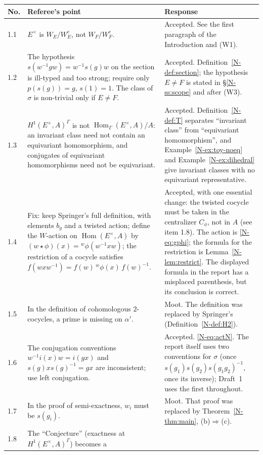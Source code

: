 \documentclass[12pt,letterpaper]{article}
\newcommand{\act}[2]{{}^{#1}\!#2}
\DeclareMathOperator{\Hom}{Hom}
\begin{document}
\begin{longtable}{@{}p{}p{}p{}@{}}
\toprule
No. & Referee's point & Response \\
\midrule
\endhead
1.1 & $E^\times$ is $W_E/W_E^c$, not $W_F/W_F^c$. & Accepted. See the
first paragraph of the Introduction and (W1). \\
1.2 & The hypothesis $s(w^{-1}gw)=w^{-1}s(g)w$ on the section is
ill-typed and too strong; require only $p(s(g))=g$, $s(1)=1$. The class of
$\sigma$ is non-trivial only if $E\neq F$. & Accepted.
Definition~\ref{N-def:section}; the hypothesis $E\neq F$ is stated in
\S\ref{N-ss:scope} and after (W3). \\
1.3 & $H^1(E^\times,A)^\Gamma$ is not
$\Hom_\Gamma(E^\times,A)/A$: an invariant class need not contain an
equivariant homomorphism, and conjugates of equivariant homomorphisms need
not be equivariant. & Accepted. Definition~\ref{N-def:T} separates
``invariant class'' from ``equivariant homomorphism'', and
Example~\ref{N-ex:toy-noeq} and Example~\ref{N-ex:dihedral} give invariant
classes with no equivariant representative. \\
1.4 & Fix: keep Springer's full definition, with elements $b_g$ and a
twisted action; define the $W$-action on $\Hom(E^\times,A)$ by
$(w\star\phi)(x)=\act{w}{\phi(w^{-1}xw)}$; the restriction of a cocycle
satisfies $f(wxw^{-1})=f(w)\,\act{w}{\phi(x)}\,f(w)^{-1}$. & Accepted,
with one essential change: the twisted cocycle must be taken in the
centralizer $C_\phi$, not in $A$ (see item 1.8). The action is
\eqref{N-eq:gphi}; the formula for the restriction is
Lemma~\ref{N-lem:restrict}. The displayed formula in the report has a
misplaced parenthesis, but its conclusion is correct. \\
1.5 & In the definition of cohomologous $2$-cocycles, a prime is missing
on $\alpha'$. & Moot. The definition was replaced by Springer's
(Definition~\ref{N-def:H2}). \\
1.6 & The conjugation conventions $w^{-1}i(x)w=i(gx)$ and
$s(g)xs(g)^{-1}=gx$ are inconsistent; use left conjugation. & Accepted.
\eqref{N-eq:actN}. The report itself uses two conventions for $\sigma$
(once $s(g_1)s(g_2)s(g_1g_2)^{-1}$, once its inverse); Draft~1 uses the
first throughout. \\
1.7 & In the proof of semi-exactness, $w_i$ must be $s(g_i)$. & Moot. That
proof was replaced by Theorem~\ref{N-thm:main}, (b)$\Rightarrow$(c). \\
1.8 & The ``Conjecture'' (exactness at $H^1(E^\times,A)^\Gamma$) becomes a

\end{longtable}
\end{document}
